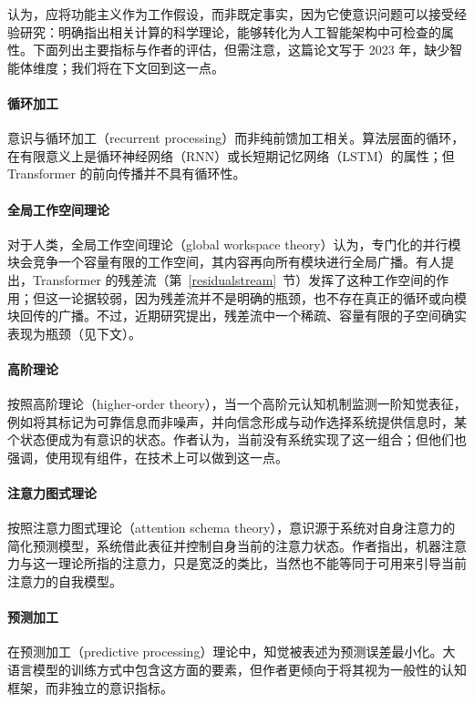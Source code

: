 \citet{butlin2023consciousness} 认为，应将功能主义作为工作假设，而非既定事实，因为它使意识问题可以接受经验研究：明确指出相关计算的科学理论，能够转化为人工智能架构中可检查的属性。下面列出主要指标与作者的评估，但需注意，这篇论文写于 2023 年，缺少智能体维度；我们将在下文回到这一点。

\paragraph{循环加工} 意识与循环加工（recurrent processing）而非纯前馈加工相关。算法层面的循环，在有限意义上是循环神经网络（RNN）或长短期记忆网络（LSTM）的属性；但 Transformer 的前向传播并不具有循环性。

\paragraph{全局工作空间理论} 对于人类，全局工作空间理论（global workspace theory）认为，专门化的并行模块会竞争一个容量有限的工作空间，其内容再向所有模块进行全局广播。有人提出，Transformer 的残差流（第~\ref{residualstream}~节）发挥了这种工作空间的作用；但这一论据较弱，因为残差流并不是明确的瓶颈，也不存在真正的循环或向模块回传的广播。不过，近期研究提出，残差流中一个稀疏、容量有限的子空间确实表现为瓶颈（见下文）\citep{gurnee2026verbalize}。

\paragraph{高阶理论} 按照高阶理论（higher-order theory），当一个高阶元认知机制监测一阶知觉表征，例如将其标记为可靠信息而非噪声，并向信念形成与动作选择系统提供信息时，某个状态便成为有意识的状态。作者认为，当前没有系统实现了这一组合；但他们也强调，使用现有组件，在技术上可以做到这一点。

\paragraph{注意力图式理论} 按照注意力图式理论（attention schema theory），意识源于系统对自身注意力的简化预测模型，系统借此表征并控制自身当前的注意力状态。作者指出，机器注意力与这一理论所指的注意力，只是宽泛的类比，当然也不能等同于可用来引导当前注意力的自我模型。

\paragraph{预测加工} 在预测加工（predictive processing）理论中，知觉被表述为预测误差最小化。大语言模型的训练方式中包含这方面的要素，但作者更倾向于将其视为一般性的认知框架，而非独立的意识指标。

